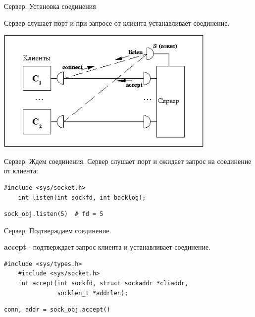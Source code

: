 \begin{frame}{Сервер. Установка соединения}

    Сервер слушает порт и при запросе от клиента устанавливает
    соединение.

    \begin{center}
        \includegraphics[width=4.2in]{media/socket-server.png}
    \end{center}
\end{frame}

\begin{frame}[fragile]{Сервер. Ждем соединения.}
    Сервер слушает порт и ожидает запрос на соединение от клиента:

    \begin{lstlisting}[style=cpp, caption=Си]
    #include <sys/socket.h>
    int listen(int sockfd, int backlog);
    \end{lstlisting}

    \begin{lstlisting}[style=python, caption=Python]
    sock_obj.listen(5)  # fd = 5
    \end{lstlisting}
\end{frame}

\begin{frame}[fragile]{Сервер. Подтверждаем соединение.}

    \textbf{accept} - подтверждает запрос клиента и устанавливает соединение.

    \begin{lstlisting}[style=cpp, caption=Си]
    #include <sys/types.h>
    #include <sys/socket.h>
    int accept(int sockfd, struct sockaddr *cliaddr,
               socklen_t *addrlen);
    \end{lstlisting}

    \begin{lstlisting}[style=python, caption=Python]
    conn, addr = sock_obj.accept()
    \end{lstlisting}
\end{frame}

